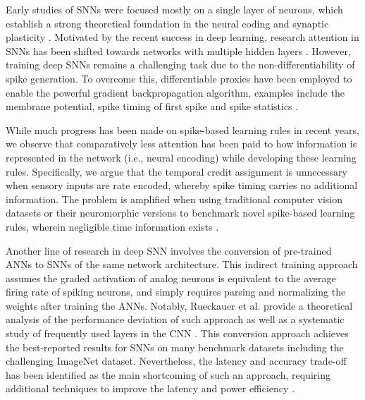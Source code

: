 \documentclass[conference]{IEEEtran}
\begin{document}
Early studies of SNNs were focused mostly on a single layer of neurons, which establish a strong theoretical foundation in the neural coding and synaptic plasticity \cite{maass1997networks,gerstner2002spiking,dayan2001theoretical}. Motivated by the recent success in deep learning, research attention in SNNs has been shifted towards networks with multiple hidden layers \cite{tavanaei2018deep,pfeiffer2018deep}. However, training deep SNNs remains a challenging task due to the non-differentiability of spike generation. To overcome this, differentiable proxies have been employed to enable the powerful gradient backpropagation algorithm, examples include the membrane potential\cite{lee2016training,shrestha2018slayer,wu2018direct}, spike timing of first spike \cite{mostafa2018supervised} and spike statistics \cite{o2016deep,stromatias2017event}.  

While much progress has been made on spike-based learning rules in recent years, we observe that comparatively less attention has been paid to how information is represented in the network (i.e., neural encoding)  while developing these learning rules. Specifically, we argue that the temporal credit assignment is unnecessary when sensory inputs are rate encoded\cite{ratecode}, whereby spike timing carries no additional information. The problem is amplified when using traditional computer vision datasets or their neuromorphic versions to benchmark novel spike-based learning rules, wherein negligible time information exists \cite{iyer2018neuromorphic}. 

Another line of research in deep SNN involves the conversion of pre-trained ANNs to SNNs of the same network architecture\cite{cao2015spiking,diehl2015fast,ethImageNet,sengupta2018going,hu2018spiking}. This indirect training approach assumes the graded activation of analog neurons is equivalent to the average firing rate of spiking neurons, and simply requires parsing and normalizing the weights after training the ANNs. Notably, Rueckauer et al. provide a theoretical analysis of the performance deviation of such approach as well as a systematic study of frequently used layers in the CNN \cite{ethImageNet,sengupta2018going,hu2018spiking}. This conversion approach achieves the best-reported results for SNNs on many benchmark datasets including the challenging ImageNet dataset\cite{deng2009imagenet}. Nevertheless, the latency and accuracy trade-off has been identified as the main shortcoming of such an approach\cite{diehl2015fast}, requiring additional techniques to improve the latency and power efficiency \cite{neil2016learning}.
\end{document}
